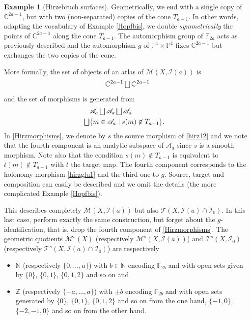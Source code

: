 \documentclass[10pt]{amsart}
\let\mathcal\mathscr
\let\oldbigsqcup\bigsqcup
\renewcommand{\bigsqcup}{\mathop{\textstyle\oldbigsqcup}\displaylimits}
\theoremstyle{plain}
\theoremstyle{definition}
\newtheorem{example}[theorem]{Example}
\theoremstyle{remark}
\numberwithin{equation}{section}
\newcommand{\CC}{{\mathbb{C}}}
\newcommand{\cI}{\mathcal{I}}
\let\uniondisjointe\bigsqcup
\begin{document}
\begin{example}[Hirzebruch surfaces]
Geometrically, we end with a single copy of $\CC^{2a-1}$, but with two (non-separated) copies of the cone $T_{a-1}$. In other words, adapting the vocabulary of Example \ref{Hopfbis}, we double \emph{symmetrically} the points of $\CC^{2a-1}$ along the cone $T_{a-1}$. The automorphism group of $\mathbb F_{2a}$ acts as previously described and the automorphism $g$ of $\mathbb P^1\times\mathbb P^1$ fixes $\CC^{2a-1}$ but exchanges the two copies of the cone.

More formally, the set of objects of an atlas of $\mathcal M(X,\cI(a))$ is
\begin{equation}
\label{Hirzobjects}
\CC^{2a-1}\uniondisjointe \CC^{2a-1}
\end{equation}
and the set of morphisms is generated from
\begin{equation}
\label{Hirzmorphisms}
\begin{aligned}
&\mathcal A_a\uniondisjointe \mathcal A_a\uniondisjointe \mathcal A_a\cr
\uniondisjointe &\{m\in\mathcal A_a\mid s(m)\not\in T_{a-1}\}.
\end{aligned}
\end{equation}
In \eqref{Hirzmorphisms}, we denote by $s$ the source morphism of \eqref{hirz12} and we note that the fourth component is an analytic subspace of $\mathcal A_a$ since $s$ is a smooth morphism. Note also that the condition $s(m)\not\in T_{a-1}$ is equivalent to $t(m)\not\in T_{a-1}$ with $t$ the target map. The fourth component corresponds to the holonomy morphism \eqref{hirzglu1} and the third one to $g$. Source, target and composition can easily be described and we omit the details (\cf the more complicated Example \ref{Hopfbis}).

This describes completely $\mathcal M(X,\cI(a))$ but also $\mathcal T(X,\cI(a)\cap \cI_0)$. In this last case, perform exactly the same construction, but forget about the $g$-identification, that is, drop the fourth component of \eqref{Hirzmorphisms}. The geometric quotients $\mathcal M^s(X)$ (respectively $\mathcal M^s(X,\cI(a))$) and $\mathcal T^s(X,\cI_0)$ (respectively $\mathcal T^s(X,\cI(a)\cap \cI_0)$) are respectively
\begin{itemize}
\item $\mathbb N$ (respectively $\{0,\hdots,a\}$) with $b\in \mathbb N$ encoding $\mathbb F_{2b}$ and with open sets given by $\{0\}$, $\{0,1\}$, $\{0,1,2\}$ and so on and
\item $\mathbb Z$ (respectively $\{-a,\hdots,a\}$) with $\pm b$ encoding $\mathbb F_{2b}$ and with open sets generated by $\{0\}$, $\{0,1\}$, $\{0,1,2\}$ and so on from the one hand, $\{-1,0\}$, $\{-2,-1,0\}$ and so on from the other hand.
\end{itemize}
\end{example}
\end{document}
